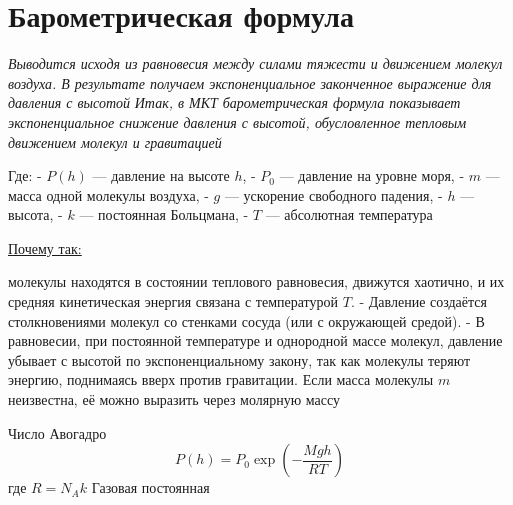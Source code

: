 \documentclass[14pt]{article}
\begin{document}
\section{Барометрическая формула}
\textit{Выводится исходя из равновесия между силами тяжести и движением молекул воздуха. В результате получаем экспоненциальное законченное выражение для давления с высотой}
\textit{Итак, в МКТ барометрическая формула показывает экспоненциальное снижение давления с высотой, обусловленное тепловым движением молекул и гравитацией}
\begin{center}
    \big[\[ P(h) = P_0 \exp\left( - \frac{m g h}{k T} \right) \]\big]
    Где: - \(P(h)\) — давление на высоте \(h\), - \(P_0\) — давление на уровне моря, - \(m\) — масса одной молекулы воздуха, - \(g\) — ускорение свободного падения, - \(h\) — высота, - \(k\) — постоянная Больцмана, - \(T\) — абсолютная температура
\end{center}
\underline{Почему так:}

молекулы находятся в состоянии теплового равновесия, движутся хаотично, и их средняя кинетическая энергия связана с температурой \(T\). - Давление создаётся столкновениями молекул со стенками сосуда (или с окружающей средой). - В равновесии, при постоянной температуре и однородной массе молекул, давление убывает с высотой по экспоненциальному закону, так как молекулы теряют энергию, поднимаясь вверх против гравитации. Если масса молекулы \(m\) неизвестна, её можно выразить через молярную массу
\begin{center}
    \newline Число Авогадро
    \[ P(h) = P_0 \exp\left( - \frac{M g h}{R T} \right) \] где \(R = N_A k\)
    \newline Газовая постоянная
\end{center}
\end{document}

